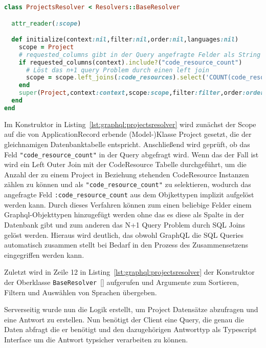 \begin{lstlisting}[language=Ruby,float=h!,caption={\emph{"Plain Old Ruby Object"} zum Auflösung der Query \lstinline|:projects|. \lstinline|/graphql/resolvers/projects_resolver.rb|}, label={lst:graphql:projectsresolver}]
class ProjectsResolver < Resolvers::BaseResolver

  attr_reader(:scope)

  def initialize(context:nil,filter:nil,order:nil,languages:nil)
    scope = Project
    # requested_columns gibt in der Query angefragte Felder als String Array zurück
    if requested_columns(context).include?("code_resource_count")
      # Löst das n+1 query Problem durch einen left join
      scope = scope.left_joins(:code_resources).select('COUNT(code_resources) AS code_resource_count').group('projects.id')
    end
    super(Project,context:context,scope:scope,filter:filter,order:order,languages:languages,order_dir: "asc",order_field:"name")
  end
end
\end{lstlisting}

Im Konstruktor in Listing~\ref{lst:graphql:projectsresolver} wird zunächst der Scope auf die von ApplicationRecord erbende (Model-)Klasse Project gesetzt, die der gleichnamigen Datenbanktabelle entspricht. Anschließend wird geprüft, ob das Feld \lstinline|"code_resource_count"| in der Query abgefragt wird. Wenn das der Fall ist wird ein Left Outer Join mit der CodeResource Tabelle durchgeführt, um die Anzahl der zu einem Project in Beziehung stehenden CodeResource Instanzen zählen zu können und als \lstinline|"code_resource_count"| zu selektieren, wodurch das angefragte Feld \lstinline|:code_resource_count| aus dem Objkettypen  implizit aufgelöst werden kann. Durch dieses Verfahren können zum einen beliebige Felder einem Graphql-Objekttypen hinzugefügt werden ohne das es diese als Spalte in der Datenbank gibt und zum anderen das N+1 Query Problem durch SQL Joins gelöst werden. 
Hieraus wird deutlich, das obwohl GraphQL die SQL Queries automatisch zusammen stellt bei Bedarf in den Prozess des Zusammensetzens eingegriffen werden kann.

Zuletzt wird in Zeile 12 in Listing~\ref{lst:graphql:projectsresolver} der Konstruktor der Oberklasse \lstinline|BaseResolver|~\ref{} aufgerufen und  Argumente zum Sortieren, Filtern und Auswählen von Sprachen übergeben.

Serverseitig wurde nun die Logik erstellt, um Project Datensätze abzufragen und eine Antwort zu erstellen.
Nun benötigt der Client eine Query, die genau die Daten abfragt die er benötigt und den dazugehörigen Antworttyp als Typescript Interface um die Antwort typsicher verarbeiten zu können.

